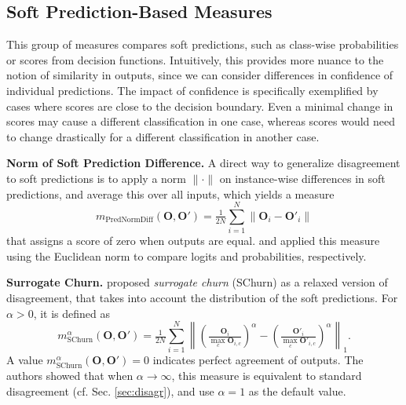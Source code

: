 \documentclass{article}
\newcommand{\citet}{\textcite}
\newcommand{\Out}{\bm{O}}
\newcommand{\Outp}{\bm{O'}}
\newcommand{\subheader}{\textbf}
\begin{document}
\subsection{Soft Prediction-Based Measures}

This group of measures compares soft predictions, such as class-wise probabilities or scores from decision functions.
Intuitively, this provides more nuance to the notion of similarity in outputs, since we can consider differences in confidence of individual predictions.
The impact of confidence is specifically exemplified by cases where scores are close to the decision boundary.
Even a minimal change in scores may cause a different classification in one case, whereas scores would need to change drastically for a different classification in another case.

\subheader{Norm of Soft Prediction Difference.}
A direct way to generalize disagreement to soft predictions is to apply a norm $\|\cdot\|$ on instance-wise differences in soft predictions, and average this over all inputs, which yields a measure
\begin{equation}\label{eq:pred_norm_diff}
    m_{\text{PredNormDiff}}(\Out, \Outp)=
    \tfrac{1}{2N}\textstyle\sum_{i=1}^N
        \left\|
            \Out_i - \Outp_i
        \right\|
\end{equation}
that assigns a score of zero when outputs are equal.
\citet{ba_deep_2014} and \citet{zhang_efficient_2021} applied this measure using the Euclidean norm to compare logits and probabilities, respectively.

\subheader{Surrogate Churn.}
\citet{bhojanapalli_reproducibility_2021} proposed \emph{surrogate churn} (SChurn) as a relaxed version of disagreement, that takes into account the distribution of the soft predictions.
For $\alpha > 0$, it is defined as
\begin{equation}
    m_{\text{SChurn}}^\alpha(\Out, \Outp)=
    \tfrac{1}{2N}\textstyle\sum_{i=1}^N
        \left\|
            \left(\tfrac{\Out_i}{\max_c \Out_{i,c}}\right)^\alpha - \left(\tfrac{\Outp_i}{\max_c \Outp_{i,c}}\right)^\alpha
        \right\|_1.
\end{equation}
A value $m_{\text{SChurn}}^\alpha(\Out, \Outp)=0$ indicates perfect agreement of outputs.
The authors showed that when $\alpha \rightarrow \infty$, this measure is equivalent to standard disagreement (cf. Sec. \ref{sec:disagr}), and use $\alpha=1$ as the default value.
\end{document}
